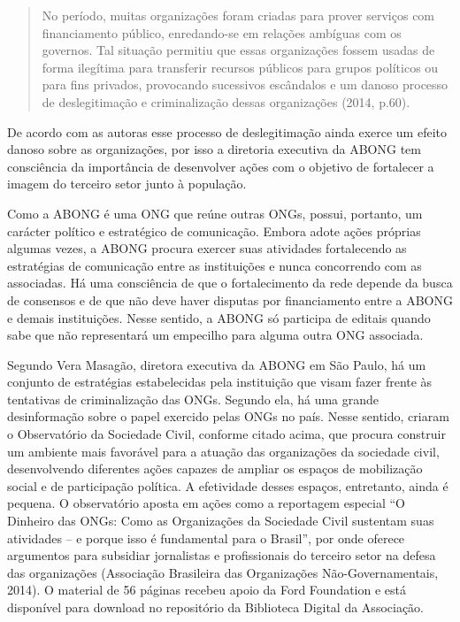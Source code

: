 \begin{quote}
No período, muitas organizações foram criadas para prover serviços com
financiamento público, enredando-se em relações ambíguas com os
governos. Tal situação permitiu que essas organizações fossem usadas de
forma ilegítima para transferir recursos públicos para grupos políticos
ou para fins privados, provocando sucessivos escândalos e um danoso
processo de deslegitimação e criminalização dessas organizações (2014,
p.60).
\end{quote}

De acordo com as autoras esse processo de deslegitimação ainda exerce um
efeito danoso sobre as organizações, por isso a diretoria executiva da
ABONG tem consciência da importância de desenvolver ações com o objetivo
de fortalecer a imagem do terceiro setor junto à população.

Como a ABONG é uma ONG que reúne outras ONGs, possui, portanto, um
carácter político e estratégico de comunicação. Embora adote ações
próprias algumas vezes, a ABONG procura exercer suas atividades
fortalecendo as estratégias de comunicação entre as instituições e nunca
concorrendo com as associadas. Há uma consciência de que o
fortalecimento da rede depende da busca de consensos e de que não deve
haver disputas por financiamento entre a ABONG e demais instituições.
Nesse sentido, a ABONG só participa de editais quando sabe que não
representará um empecilho para alguma outra ONG associada.

Segundo Vera Masagão, diretora executiva da ABONG em São Paulo, há um
conjunto de estratégias estabelecidas pela instituição que visam fazer
frente às tentativas de criminalização das ONGs. Segundo ela, há uma
grande desinformação sobre o papel exercido pelas ONGs no país. Nesse
sentido, criaram o Observatório da Sociedade Civil, conforme citado
acima, que procura construir um ambiente mais favorável para a atuação
das organizações da sociedade civil, desenvolvendo diferentes ações
capazes de ampliar os espaços de mobilização social e de participação
política. A efetividade desses espaços, entretanto, ainda é pequena. O
observatório aposta em ações como a reportagem especial ``O Dinheiro das
ONGs: Como as Organizações da Sociedade Civil sustentam suas atividades
-- e porque isso é fundamental para o Brasil'', por onde oferece
argumentos para subsidiar jornalistas e profissionais do terceiro setor
na defesa das organizações (Associação Brasileira das Organizações
Não-Governamentais, 2014). O material de 56 páginas recebeu apoio da
Ford Foundation e está disponível para download no repositório da
Biblioteca Digital da Associação.


